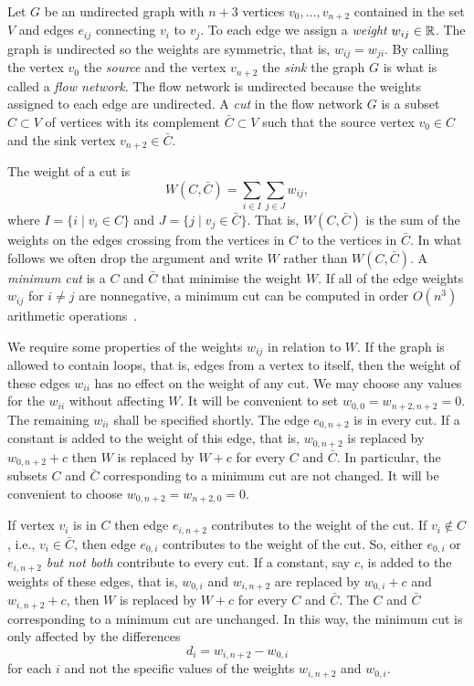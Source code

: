\documentclass[final,leqno]{siamltex}
\begin{document}
Let $G$ be an undirected graph with $n+3$ vertices $v_0, \dots, v_{n+2}$ contained in the set $V$ and edges $e_{ij}$ connecting $v_i$ to $v_j$.  To each edge we assign a \emph{weight} $w_{ij} \in {\mathbb R}$.  The graph is undirected so the weights are symmetric, that is, $w_{ij} = w_{ji}$.  By calling the vertex $v_0$ the \emph{source} and the vertex $v_{n+2}$ the \emph{sink} the graph $G$ is what is called a \emph{flow network}.  The flow network is undirected because the weights assigned to each edge are undirected.  A \emph{cut} in the flow network $G$ is a subset $C \subset V$ of vertices with its complement $\bar{C} \subset V$ such that the source vertex $v_0 \in C$ and the sink vertex $v_{n+2} \in \bar{C}$.  %

The weight of a cut is
\[
W(C,\bar{C}) = \sum_{i \in I} \sum_{j \in J} w_{ij}, 
\]
where $I = \{ i \mid v_i \in C\}$ and $J = \{j \mid v_j \in \bar{C}\}$.  That is, $W(C,\bar{C})$ is the sum of the weights on the edges crossing from the vertices in $C$ to the vertices in $\bar{C}$.  In what follows we often drop the argument and write $W$ rather than $W(C,\bar{C})$.  A \emph{minimum cut} is a $C$ and $\bar{C}$ that minimise the weight $W$.  If all of the edge weights $w_{ij}$ for $i \neq j$ are nonnegative, a minimum cut can be computed in 
order $O(n^3)$ arithmetic operations~\cite{Cormen2001,Even_graph_algorithms_1979}.

We require some properties of the weights $w_{ij}$ in relation to $W$.  If the graph is allowed to contain loops, that is, edges from a vertex to itself, then the weight of these edges $w_{ii}$ has no effect on the weight of any cut.  We may choose any values for the $w_{ii}$ without affecting $W$.  It will be convenient to set $w_{0,0} = w_{n+2,n+2} = 0$.  The remaining $w_{ii}$ shall be specified shortly.  The edge $e_{0,n+2}$ is in every cut.  If a constant is added to the weight of this edge, that is, $w_{0,n+2}$ is replaced by $w_{0,n+2} + c$ then $W$ is replaced by $W + c$ for every $C$ and $\bar{C}$.  In particular, the subsets $C$ and $\bar{C}$ corresponding to a minimum cut are not changed.  It will be convenient to choose $w_{0,n+2} = w_{n+2,0} = 0$.  

If vertex $v_i$ is in $C$ then edge $e_{i,n+2}$ contributes to the weight of the cut.  If $v_i \notin C$, i.e., $v_i \in \bar{C}$, then edge $e_{0,i}$ contributes to the weight of the cut.  So, either $e_{0,i}$ or $e_{i,n+2}$ \emph{but not both} contribute to every cut.  If a constant, say $c$, is added to the weights of these edges, that is, $w_{0,i}$ and $w_{i,n+2}$ are replaced by $w_{0,i} + c$ and $w_{i,n+2} + c$, then $W$ is replaced by $W + c$ for every $C$ and $\bar{C}$.  The $C$ and $\bar{C}$ corresponding to a minimum cut are unchanged.  In this way, the minimum cut is only affected by the differences 
\[
d_i = w_{i,n+2} - w_{0,i}
\]
for each $i$ and not the specific values of the weights $w_{i,n+2}$ and $w_{0,i}$.  %
\end{document}
